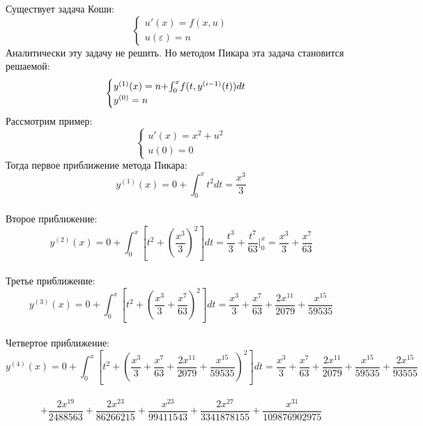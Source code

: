 \documentclass[a4paper, 12pt]{article}
\begin{document}
	Существует задача Коши:
	\begin{equation*} 
		\begin{cases}
			u'(x) = f(x, u)\\
			u(\varepsilon) = n
		\end{cases}
	\end{equation*}
	Аналитически эту задачу не решить. Но методом Пикара эта задача становится решаемой:
	\begin{equation*} 
		\begin{cases}
			y^{(1)}(x) = n + $$\int_0^x$$ f(t, y^{(i - 1)}(t))dt\\
			y^{(0)} = n
		\end{cases}
	\end{equation*}
	Рассмотрим пример:
	\begin{equation*} 
		\begin{cases}
			u'(x) = x^2 + u^2\\
			u(0) = 0
		\end{cases}
	\end{equation*}
	Тогда первое приближение метода Пикара:
	$$ y^{(1)}(x) = 0 +\int_{0}^{x} t^2dt = \frac{x^3}{3} $$
	\\Второе приближение:
	$$ y^{(2)}(x) = 0 +\int_{0}^{x} [t^2 + (\frac{x^3}{3})^2]dt = \frac{t^3}{3} + \frac{t^7}{63}\bigg|_0^x =  \frac{x^3}{3} + \frac{x^7}{63}$$
	\\Третье приближение:
	$$ y^{(3)}(x) = 0 +\int_{0}^{x} [t^2 + (\frac{x^3}{3} + \frac{x^7}{63})^2]dt = \frac{x^3}{3} + \frac{x^7}{63} + \frac{2x^{11}}{2079} + \frac{x^{15}}{59535}$$
	\\Четвертое приближение:
	$$ y^{(4)}(x) = 0 +\int_{0}^{x} [t^2 + (\frac{x^3}{3} + \frac{x^7}{63} + \frac{2x^{11}}{2079} + \frac{x^{15}}{59535})^2]dt = \frac{x^3}{3} + \frac{x^7}{63} + \frac{2x^{11}}{2079} + \frac{x^{15}}{59535} +\frac{2x^{15}}{93555}$$ \\$$ + \frac{2x^{19}}{2488563} + \frac{2x^{23}}{86266215} + \frac{x^{23}}{99411543} + \frac{2x^{27}}{3341878155} + \frac{x^{31}}{109876902975}$$
\end{document}
